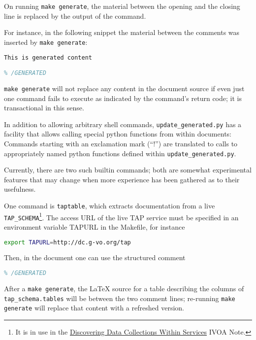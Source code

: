 \documentclass[11pt,a4paper]{ivoa}
\begin{document}
On running \texttt{make generate}, the material between the opening and
the closing line is replaced by the output of the command.

For instance, in the following snippet the material between the comments
was inserted by \texttt{make generate}:

\begin{lstlisting}[language=TeX]
% GENERATED: echo This is generated content
This is generated content

% /GENERATED
\end{lstlisting}

\texttt{make generate} will not replace any content in the document source
if even just one command fails to execute as indicated by the
command's return code; it is transactional in this sense.

In addition to allowing arbitrary shell
commands, \texttt{update\_generated.py} has a facility that allows
calling special python functions from within documents: Commands
starting with an exclamation mark (``!'') are translated to calls to
appropriately named python functions defined within
\texttt{update\_generated.py}.

Currently, there are two such builtin commands; both are somewhat
experimental features that may change when more experience has been
gathered as to their usefulness.

One command is \texttt{taptable}, which extracts documentation from a
live \texttt{TAP\_SCHEMA}\footnote{It is in use in the
\href{https://volute.g-vo.org/svn/trunk/projects/registry/discovercollections}{Discovering
Data Collections Within Services} IVOA Note.}.  The access URL of the
live TAP service must be specified in an environment variable TAPURL in
the Makefile, for instance

\begin{lstlisting}[language=sh]
export TAPURL=http://dc.g-vo.org/tap
\end{lstlisting}

Then, in the document one can use the structured comment

\begin{lstlisting}[language=TeX]
% GENERATED: !taptable tap_schema.tables
% /GENERATED
\end{lstlisting}

After a \texttt{make generate}, the LaTeX source for a table describing
the columns of \texttt{tap\_schema.tables} will be between the two
comment lines; re-running \texttt{make generate} will replace that
content with a refreshed version.
\end{document}
